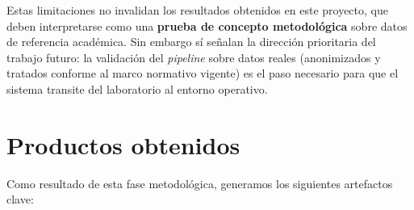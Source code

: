 \documentclass[IB]{TFUOC}%
\begin{document}
\noindent Estas limitaciones no invalidan los resultados obtenidos en este 
proyecto, que deben interpretarse como una \textbf{prueba de concepto 
metodológica} sobre datos de referencia académica. Sin embargo sí señalan 
la dirección prioritaria del trabajo futuro: la validación del \textit{pipeline} 
sobre datos reales (anonimizados y tratados conforme al marco normativo 
vigente) es el paso necesario para que el sistema transite del laboratorio 
al entorno operativo.


    
\section{Productos obtenidos}

Como resultado de esta fase metodológica, generamos los siguientes artefactos clave:
\end{document}
